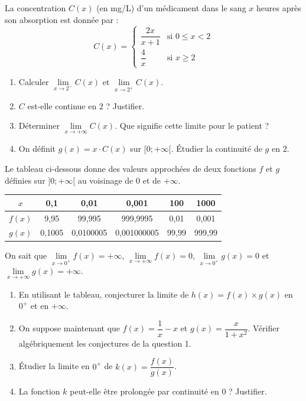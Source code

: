 \documentclass[11pt]{article}
\begin{document}
\begin{exercice}
La concentration $C(x)$ (en mg/L) d'un médicament dans le sang $x$ heures après son absorption est donnée par :
\[
C(x) = \begin{cases}
\dfrac{2x}{x+1} & \text{si } 0 \leq x < 2 \\[1em]
\dfrac{4}{x} & \text{si } x \geq 2
\end{cases}
\]
\begin{enumerate}
    \item Calculer $\lim\limits_{x \to 2^-} C(x)$ et $\lim\limits_{x \to 2^+} C(x)$.
    \item $C$ est-elle continue en $2$ ? Justifier.
    \item Déterminer $\lim\limits_{x \to +\infty} C(x)$. Que signifie cette limite pour le patient ?
    \item On définit $g(x) = x \cdot C(x)$ sur $[0 ; +\infty[$. Étudier la continuité de $g$ en $2$.
\end{enumerate}
\end{exercice}

\begin{exercice}
Le tableau ci-dessous donne des valeurs approchées de deux fonctions $f$ et $g$ définies sur $]0 ; +\infty[$ au voisinage de $0$ et de $+\infty$.

\begin{center}
\begin{tabular}{|c|c|c|c|c|c|}
\hline
$x$ & 0,1 & 0,01 & 0,001 & 100 & 1000 \\
\hline
$f(x)$ & 9,95 & 99,995 & 999,9995 & 0,01 & 0,001 \\
\hline
$g(x)$ & 0,1005 & 0,0100005 & 0,001000005 & 99,99 & 999,99 \\
\hline
\end{tabular}
\end{center}
On sait que $\lim\limits_{x \to 0^+} f(x) = +\infty$, $\lim\limits_{x \to +\infty} f(x) = 0$, $\lim\limits_{x \to 0^+} g(x) = 0$ et $\lim\limits_{x \to +\infty} g(x) = +\infty$.
\begin{enumerate}
    \item En utilisant le tableau, conjecturer la limite de $h(x) = f(x) \times g(x)$ en $0^+$ et en $+\infty$.
    \item On suppose maintenant que $f(x) = \dfrac{1}{x} - x$ et $g(x) = \dfrac{x}{1+x^2}$. Vérifier algébriquement les conjectures de la question 1.
    \item Étudier la limite en $0^+$ de $k(x) = \dfrac{f(x)}{g(x)}$. 
    \item La fonction $k$ peut-elle être prolongée par continuité en $0$ ? Justifier.
\end{enumerate}
\end{exercice}
\end{document}
